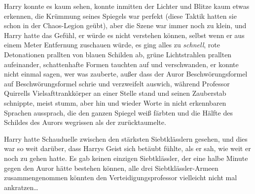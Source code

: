 Harry konnte es kaum sehen, konnte inmitten der Lichter und Blitze kaum etwas erkennen, die Krümmung seines Spiegels war perfekt (diese Taktik hatten sie schon in der Chaos-Legion geübt), aber die Szene war immer noch zu klein, und Harry hatte das Gefühl, er würde es nicht verstehen können, selbst wenn er aus einem Meter Entfernung zuschauen würde, es ging alles zu \emph{schnell}, rote Detonationen prallten von blauen Schilden ab, grüne Lichtstrahlen prallten aufeinander, schattenhafte Formen tauchten auf und verschwanden, er konnte nicht einmal sagen, wer was zauberte, außer dass der Auror Beschwörungsformel auf Beschwörungsformel schrie und verzweifelt auswich, während Professor Quirrells Vielsafttrankkörper an einer Stelle stand und seinen Zauberstab schnippte, meist stumm, aber hin und wieder Worte in nicht erkennbaren Sprachen aussprach, die den ganzen Spiegel weiß färbten und die Hälfte des Schildes des Aurors wegrissen als der zurücktaumelte.

Harry hatte Schauduelle zwischen den stärksten Siebtklässlern gesehen, und dies war so weit darüber, dass Harrys Geist sich betäubt fühlte, als er sah, wie weit er noch zu gehen hatte. Es gab keinen einzigen Siebtklässler, der eine halbe Minute gegen den Auror hätte bestehen können, alle drei Siebtklässler-Armeen zusammengenommen könnten den Verteidigungsprofessor vielleicht nicht mal ankratzen…

